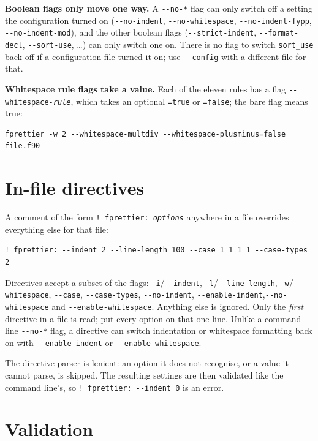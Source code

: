 \documentclass[11pt,a4paper,openany]{book}
\newcommand{\code}[1]{\texttt{\small #1}}
\newcommand{\flag}[1]{\texttt{\small -{}-#1}}
\begin{document}
\textbf{Boolean flags only move one way.} A \flag{no-*} flag can only switch
off a setting the configuration turned on (\flag{no-indent},
\flag{no-whitespace}, \flag{no-indent-fypp}, \flag{no-indent-mod}), and the
other boolean flags (\flag{strict-indent}, \flag{format-decl},
\flag{sort-use}, \ldots) can only switch one on. There is no flag to switch
\code{sort\_use} back off if a configuration file turned it on; use
\flag{config} with a different file for that.

\textbf{Whitespace rule flags take a value.} Each of the eleven rules has a
flag \code{-{}-whitespace-\textit{rule}}, which takes an optional
\code{=true} or \code{=false}; the bare flag means true:

\begin{lstlisting}[style=shell]
fprettier -w 2 --whitespace-multdiv --whitespace-plusminus=false file.f90
\end{lstlisting}

\section{In-file directives}

A comment of the form \code{! fprettier: \textit{options}} anywhere in a file
overrides everything else for that file:

\begin{lstlisting}[style=fortran]
! fprettier: --indent 2 --line-length 100 --case 1 1 1 1 --case-types 2
\end{lstlisting}

Directives accept a subset of the flags: \code{-i}/\flag{indent},
\code{-l}/\flag{line-length}, \code{-w}/\flag{whitespace}, \flag{case},
\flag{case-types}, \flag{no-indent}, \flag{enable-indent},\linebreak[2]
\flag{no-whitespace} and \flag{enable-whitespace}. Anything else is ignored.
Only the \emph{first} directive in a file is read; put every option on that
one line. Unlike a command-line \flag{no-*} flag, a directive can switch
indentation or whitespace formatting back on with \flag{enable-indent} or
\flag{enable-whitespace}.

The directive parser is lenient: an option it does not recognise, or a value it
cannot parse, is skipped. The resulting settings are then validated like the
command line's, so \code{! fprettier: -{}-indent 0} is an error.

\section{Validation}
\end{document}
